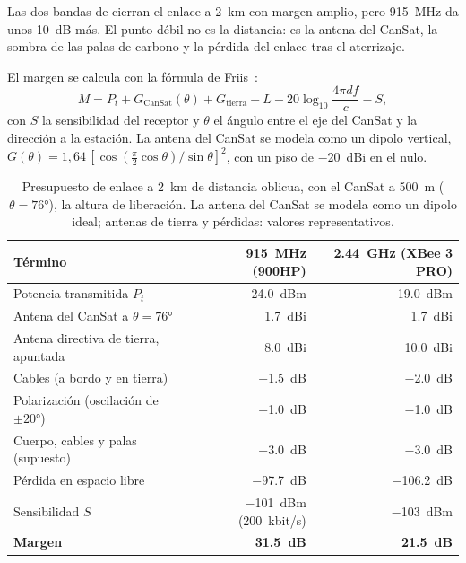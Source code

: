 Las dos bandas de  cierran el enlace a \SI{2}{km} con margen amplio, pero
\SI{915}{MHz} da unos \SI{10}{dB} más. El punto débil no es la distancia: es la antena del
CanSat, la sombra de las palas de carbono y la pérdida del enlace tras el aterrizaje.

El margen se calcula con la fórmula de Friis~\cite{electronica-friis1946}:
\begin{equation}
  M = P_t + G_{\mathrm{CanSat}}(\theta) + G_{\mathrm{tierra}} - L - 20\log_{10}\frac{4\pi d f}{c} - S,
  \label{eq:electronica-friis}
\end{equation}
con $S$ la sensibilidad del receptor y $\theta$ el ángulo entre el eje del CanSat y la
dirección a la estación. La antena del CanSat se modela como un dipolo vertical,
$G(\theta)=1{,}64\,[\cos(\tfrac\pi2\cos\theta)/\sin\theta]^2$, con un piso de
\SI{-20}{dBi} en el nulo.

\begin{table}[H]
\centering\small
\caption{Presupuesto de enlace a \SI{2}{km} de distancia oblicua, con el CanSat a
\SI{500}{m} ($\theta=\ang{76}$), la altura de liberación. La antena del CanSat se modela
como un dipolo ideal; antenas de tierra y pérdidas: valores
representativos.}\label{tab:electronica-enlace}
\begin{tabular}{@{}lrr@{}}
\toprule
\textbf{Término} & \textbf{\SI{915}{MHz}} (900HP) & \textbf{\SI{2.44}{GHz}} (XBee 3 PRO)\\\midrule
Potencia transmitida $P_t$ & \SI{24.0}{dBm} & \SI{19.0}{dBm}\\
Antena del CanSat a $\theta=\ang{76}$ & \SI{1.7}{dBi} & \SI{1.7}{dBi}\\
Antena directiva de tierra, apuntada & \SI{8.0}{dBi} & \SI{10.0}{dBi}\\
Cables (a bordo y en tierra) & \SI{-1.5}{dB} & \SI{-2.0}{dB}\\
Polarización (oscilación de $\pm\ang{20}$) & \SI{-1.0}{dB} & \SI{-1.0}{dB}\\
Cuerpo, cables y palas (supuesto) & \SI{-3.0}{dB} & \SI{-3.0}{dB}\\
Pérdida en espacio libre & \SI{-97.7}{dB} & \SI{-106.2}{dB}\\
Sensibilidad $S$ & \SI{-101}{dBm} (\SI{200}{kbit/s}) & \SI{-103}{dBm}\\\midrule
\textbf{Margen} & \textbf{\SI{31.5}{dB}} & \textbf{\SI{21.5}{dB}}\\
\bottomrule
\end{tabular}
\end{table}

